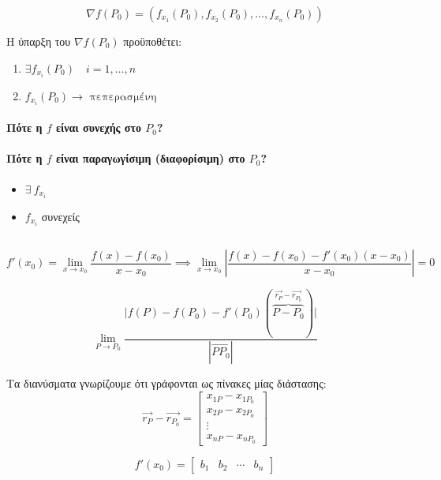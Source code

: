 \documentclass[11pt,a4paper,titlepage,draft]{article}
\begin{document}
\subsubsection{}
\[
\nabla f(P_0) =
\left(
f_{x_1}(P_0),f_{x_2}(P_0),\dots,f_{x_n}(P_0)
\right)
\]

Η ύπαρξη του \(\nabla f(P_0)\) προϋποθέτει:
\begin{enumerate}
\item \(\exists f_{x_i}(P_0)\quad i=1,\dots,n\)
\item \(f_{x_i}(P_0) \rightarrow \text{ πεπερασμένη}\)
\end{enumerate}

\paragraph{Πότε η \(f\) είναι συνεχής στο \(P_0\)?}

\paragraph{Πότε η \(f\) είναι παραγωγίσιμη (διαφορίσιμη) στο \(P_0\)?}
\begin{itemize}
\item \(\exists \ f_{x_i}\)
\item \(f_{x_i}\) συνεχείς
\end{itemize}

\subsection{}
\[
f'(x_0) = \lim_{x\to x_0}\frac{f(x)-f(x_0)}{x-x_0}
\implies
\lim_{x\to x_0} \left|
\frac{f(x)-f(x_0)-f'(x_0)(x-x_0)}{x-x_0}
\right| = 0
\]

\[
\lim_{P\to P_0}
\frac{
\Big|
f(P)-f(P_0)-f'(P_0)(\overbrace{P-P_0}^{\vec{r_P}-\vec{r_{P_0}}})
\Big|
}{|\overrightarrow{PP_0}|}
\]

Τα διανύσματα γνωρίζουμε ότι γράφονται ως πίνακες μίας διάστασης:
\[
\vec{r_P}-\vec{r_{P_0}} =
\begin{bmatrix}
x_{1P}-x_{1P_0}\\
x_{2P}-x_{2P_0}\\
\vdots\\
x_{nP}-x_{nP_0}
\end{bmatrix}
\]

\[
f'(x_0)=\begin{bmatrix}
b_1&b_2&\cdots&b_n
\end{bmatrix}
\]
\end{document}

